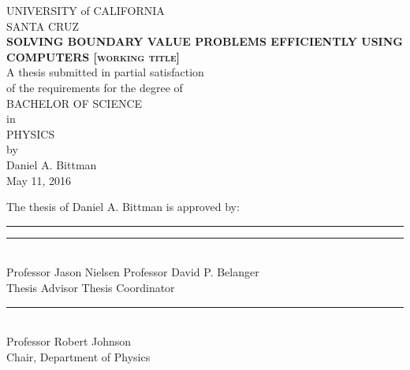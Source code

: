 \documentclass[12pt]{article}
\begin{document}
\begin{center}

	UNIVERSITY of CALIFORNIA\\
	\vspace{2mm}
	SANTA CRUZ\\
	\vspace{10mm}
	{\large\textbf{\textsc{SOLVING BOUNDARY VALUE PROBLEMS EFFICIENTLY USING COMPUTERS [working title]}}}\\
	\vspace{10mm}
	A thesis submitted in partial satisfaction\\of the requirements for the degree of\\
	\vspace{5mm}
	\textsc{BACHELOR OF SCIENCE}\\
	\vspace{3mm}
	in\\
	\vspace{3mm}
	\textsc{PHYSICS}\\
	\vspace{5mm}
	by\\
	\vspace{2mm}
	Daniel A. Bittman\\
	May 11, 2016\\

	\vspace{2in}

	The thesis of Daniel A. Bittman is approved by:\\
	\vspace{1in}

	\rule{2.5in}{2pt}\hfill
	\rule{2.5in}{2pt} \\
	Professor Jason Nielsen \hfill Professor David P. Belanger\\
	Thesis Advisor \hfill Thesis Coordinator\\

	\vspace{15mm}
	\rule{2.5in}{2pt}\\
	Professor Robert Johnson\\
	Chair, Department of Physics

\end{center}

\clearpage
\setcounter{page}{1}
\renewcommand{\thepage}{\roman{page}}
\end{document}
